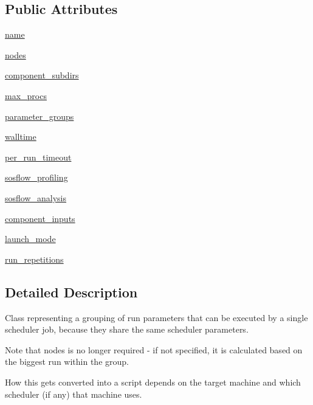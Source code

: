 \subsection*{Public Attributes}
\begin{DoxyCompactItemize}
\item 
\hyperlink{classcodar_1_1cheetah_1_1parameters_1_1_sweep_group_a9c28251333071666d6a7dd6cd0b705b7}{name}
\item 
\hyperlink{classcodar_1_1cheetah_1_1parameters_1_1_sweep_group_a182a7d70fb42a64c5827af196ea0a318}{nodes}
\item 
\hyperlink{classcodar_1_1cheetah_1_1parameters_1_1_sweep_group_a3349e5f59c6f0c01c8567fca9a7bf379}{component\+\_\+subdirs}
\item 
\hyperlink{classcodar_1_1cheetah_1_1parameters_1_1_sweep_group_ae0898ce10b93a7aff13a24d509eb02f9}{max\+\_\+procs}
\item 
\hyperlink{classcodar_1_1cheetah_1_1parameters_1_1_sweep_group_a2e499b036b7c772334712ee39a8ca5a5}{parameter\+\_\+groups}
\item 
\hyperlink{classcodar_1_1cheetah_1_1parameters_1_1_sweep_group_ac7b047d68024e7c4ebaf6203b9f74a6d}{walltime}
\item 
\hyperlink{classcodar_1_1cheetah_1_1parameters_1_1_sweep_group_ac5d5071a253e0a5da878c7df92784146}{per\+\_\+run\+\_\+timeout}
\item 
\hyperlink{classcodar_1_1cheetah_1_1parameters_1_1_sweep_group_ab237a0acde1dc1e52d5459811a6ce3d7}{sosflow\+\_\+profiling}
\item 
\hyperlink{classcodar_1_1cheetah_1_1parameters_1_1_sweep_group_a91825daeec65de2781c33cd882440896}{sosflow\+\_\+analysis}
\item 
\hyperlink{classcodar_1_1cheetah_1_1parameters_1_1_sweep_group_a4085f622e238b237b685ca82cf57ff0e}{component\+\_\+inputs}
\item 
\hyperlink{classcodar_1_1cheetah_1_1parameters_1_1_sweep_group_aab0922af464666db293542868a254191}{launch\+\_\+mode}
\item 
\hyperlink{classcodar_1_1cheetah_1_1parameters_1_1_sweep_group_af2263721c5031a2a4dd85ae039f670d4}{run\+\_\+repetitions}
\end{DoxyCompactItemize}


\subsection{Detailed Description}
\begin{DoxyVerb}Class representing a grouping of run parameters that can be executed by
a single scheduler job, because they share the same scheduler parameters.

Note that nodes is no longer required - if not specified, it is calculated
based on the biggest run within the group.

How this gets converted into a script depends on the target machine and
which scheduler (if any) that machine uses.
\end{DoxyVerb}
 


